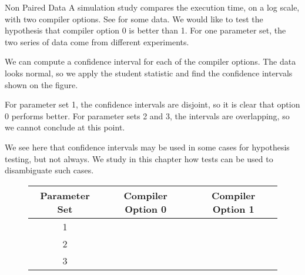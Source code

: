 %
\begin{ex}{Non Paired Data}
A simulation study compares the execution
time, on a log scale, with two compiler options. See
 for some data. We would like to test the
hypothesis that compiler option 0 is better than 1. For one
parameter set, the two series of data come from different
experiments.

We can compute a confidence interval for each of the compiler
options. The data looks normal, so we apply the student
statistic and find the confidence intervals shown on the
figure.

For parameter set 1, the confidence intervals are disjoint, so
it is clear that option 0 performs better. For parameter sets 2
and 3, the intervals are overlapping, so we cannot conclude at
this point.

We see here that confidence intervals may be used in some cases
for hypothesis testing, but not always. We study in this
chapter how tests can be used to disambiguate such cases.
\end{ex}
\begin{figure}[!htbp]\begin{center}
\begin{tabular}{c|c|c}
\hline
 Parameter Set & Compiler Option 0 & Compiler Option 1 \\ \hline
 \hline
 1 & \\ \hline
 2 & \\ \hline
 3 & \\ \hline
\end{tabular}
  \end{center}
  \label{fig-examp451}
\end{figure}

